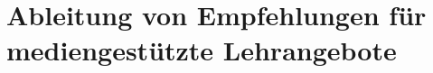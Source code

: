 \documentclass[150]{HSMW-Thesis}
\begin{document}
\chapter{Ableitung von Empfehlungen für mediengestützte Lehrangebote}



\Anhang



\end{document}

